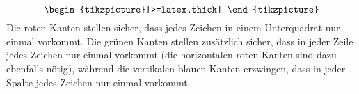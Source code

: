 \begin{loesung}
\begin{equation}
\begin{tikzpicture}[>=latex,thick]
\end{tikzpicture}
\label{70000028:vorgaben}
\end{equation}
Die roten Kanten stellen sicher, dass jedes Zeichen in einem Unterquadrat
nur einmal vorkommt.
Die grünen Kanten stellen zusätzlich sicher, dass in jeder Zeile jedes
Zeichen nur einmal vorkommt (die horizontalen roten Kanten sind dazu
ebenfalls nötig), während die vertikalen blauen Kanten erzwingen, dass
in jeder Spalte jedes Zeichen nur einmal vorkommt.


\end{loesung}
